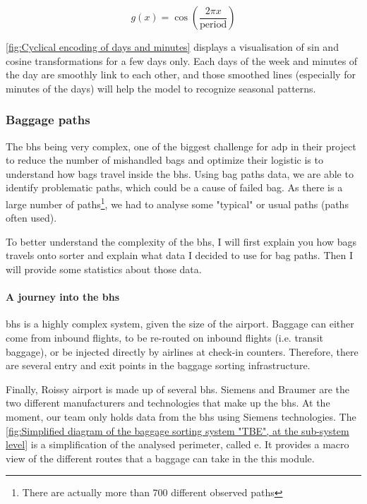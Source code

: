 \documentclass[12pt]{article}
\begin{document}
\begin{equation}
g(x) = \cos\left(\frac{2\pi x}{\text{period}}\right)
\end{equation}

\autoref{fig:Cyclical encoding of days and minutes} displays a visualisation of sin and cosine transformations for a few days only. Each days of the week and minutes of the day are smoothly link to each other, and those smoothed lines (especially for minutes of the days) will help the model to recognize seasonal patterns.  

\FloatBarrier

\newpage
\subsubsection{Baggage paths}

The \acrlong{bhs} being very complex, one of the biggest challenge for \acrshort{adp} in their project to reduce the number of mishandled bags and optimize their logistic is to understand how bags travel inside the \acrshort{bhs}. Using bag paths data, we are able to identify problematic paths, which could be a cause of failed bag. As there is a large number of paths\footnote{There are actually more than 700 different observed paths}, we had to analyse some "typical" or usual paths (paths often used).

To better understand the complexity of the \acrshort{bhs}, I will first explain you how bags travels onto sorter and explain what data I decided to use for bag paths. Then I will provide some statistics about those data.

\paragraph{A journey into the \acrshort{bhs}} \acrlong{bhs} is a highly complex system, given the size of the airport. Baggage can either come from inbound flights, to be re-routed on inbound flights (i.e. transit baggage), or be injected directly by airlines at check-in counters. Therefore, there are several entry and exit points in the baggage sorting infrastructure.

Finally, Roissy airport is made up of several \acrlong{bhs}. Siemens and Braumer are the two different manufacturers and technologies that make up the \acrshort{bhs}. At the moment, our team only holds data from the \acrshort{bhs} using Siemens technologies. The \autoref{fig:Simplified diagram of the baggage sorting system "TBE", at the sub-system level} is a simplification of the analysed perimeter, called \acrshort{e}. It provides a macro view of the different routes that a baggage can take in the this module.
\end{document}
